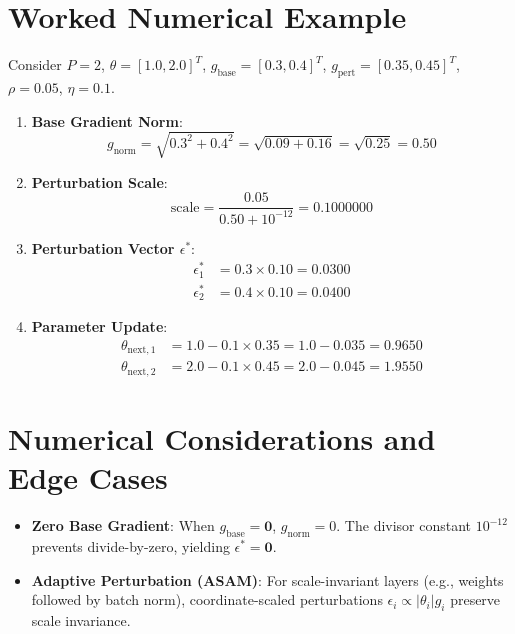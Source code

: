 \documentclass[11pt,a4paper]{article}
\theoremstyle{definition}
\begin{document}
\section{Worked Numerical Example}

Consider $P=2$, $\theta = [1.0, 2.0]^T$, $g_{\text{base}} = [0.3, 0.4]^T$, $g_{\text{pert}} = [0.35, 0.45]^T$, $\rho = 0.05$, $\eta = 0.1$.

\begin{enumerate}
    \item \textbf{Base Gradient Norm}:
    \begin{equation}
    g_{\text{norm}} = \sqrt{0.3^2 + 0.4^2} = \sqrt{0.09 + 0.16} = \sqrt{0.25} = 0.50
    \end{equation}
    \item \textbf{Perturbation Scale}:
    \begin{equation}
    \text{scale} = \frac{0.05}{0.50 + 10^{-12}} = 0.1000000
    \end{equation}
    \item \textbf{Perturbation Vector $\epsilon^*$}:
    \begin{align}
    \epsilon_1^* &= 0.3 \times 0.10 = 0.0300 \\
    \epsilon_2^* &= 0.4 \times 0.10 = 0.0400
    \end{align}
    \item \textbf{Parameter Update}:
    \begin{align}
    \theta_{\text{next}, 1} &= 1.0 - 0.1 \times 0.35 = 1.0 - 0.035 = 0.9650 \\
    \theta_{\text{next}, 2} &= 2.0 - 0.1 \times 0.45 = 2.0 - 0.045 = 1.9550
    \end{align}
\end{enumerate}

\section{Numerical Considerations and Edge Cases}

\begin{itemize}
    \item \textbf{Zero Base Gradient}: When $g_{\text{base}} = \mathbf{0}$, $g_{\text{norm}} = 0$. The divisor constant $10^{-12}$ prevents divide-by-zero, yielding $\epsilon^* = \mathbf{0}$.
    \item \textbf{Adaptive Perturbation (ASAM)}: For scale-invariant layers (e.g., weights followed by batch norm), coordinate-scaled perturbations $\epsilon_i \propto |\theta_i| g_i$ preserve scale invariance.
\end{itemize}
\end{document}
